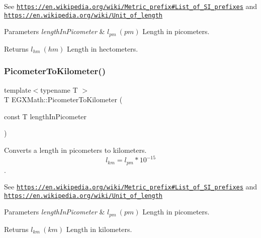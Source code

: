 See \href{https://en.wikipedia.org/wiki/Metric_prefix#List_of_SI_prefixes}{\tt https\+://en.\+wikipedia.\+org/wiki/\+Metric\+\_\+prefix\#\+List\+\_\+of\+\_\+\+S\+I\+\_\+prefixes} and \href{https://en.wikipedia.org/wiki/Unit_of_length}{\tt https\+://en.\+wikipedia.\+org/wiki/\+Unit\+\_\+of\+\_\+length} 
\begin{DoxyParams}{Parameters}
{\em length\+In\+Picometer} & $ l_{pm}\ (pm)$ Length in picometers. \\
\hline
\end{DoxyParams}
\begin{DoxyReturn}{Returns}
$ l_{hm}\ (hm)$ Length in hectometers. 
\end{DoxyReturn}
\mbox{\label{group___e_g_x_math-_conversions-_length_conversions-_s_i-_picometer-_s_i_ga8a1f5000b027dfc9980738a0565c773e}} 
\subsubsection{\texorpdfstring{Picometer\+To\+Kilometer()}{PicometerToKilometer()}}
{\footnotesize\ttfamily template$<$typename T $>$ \\
T E\+G\+X\+Math\+::\+Picometer\+To\+Kilometer (\begin{DoxyParamCaption}\item[{const T}]{length\+In\+Picometer }\end{DoxyParamCaption})}



Converts a length in picometers to kilometers. \[ l_{km}=l_{pm} * 10^{-15} \]. 

See \href{https://en.wikipedia.org/wiki/Metric_prefix#List_of_SI_prefixes}{\tt https\+://en.\+wikipedia.\+org/wiki/\+Metric\+\_\+prefix\#\+List\+\_\+of\+\_\+\+S\+I\+\_\+prefixes} and \href{https://en.wikipedia.org/wiki/Unit_of_length}{\tt https\+://en.\+wikipedia.\+org/wiki/\+Unit\+\_\+of\+\_\+length} 
\begin{DoxyParams}{Parameters}
{\em length\+In\+Picometer} & $ l_{pm}\ (pm)$ Length in picometers. \\
\hline
\end{DoxyParams}
\begin{DoxyReturn}{Returns}
$ l_{km}\ (km)$ Length in kilometers. 
\end{DoxyReturn}
\mbox{\label{group___e_g_x_math-_conversions-_length_conversions-_s_i-_picometer-_s_i_gacf6647b0c2ac985376601d5095fa1624}} 
